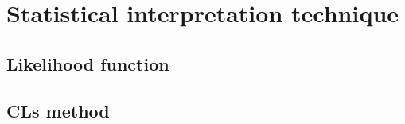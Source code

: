 \chapter[Statistical interpretation technique][Statistical interpretation]
        {Statistical interpretation technique}


\section{Likelihood function}

\section{CLs method}

